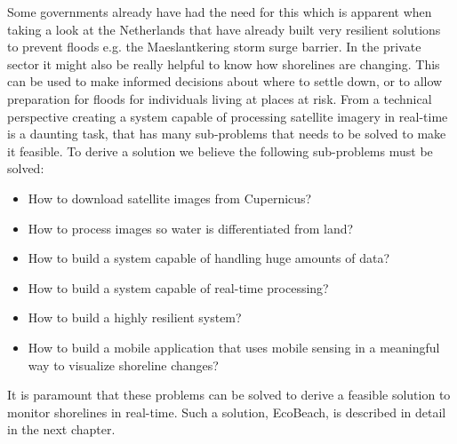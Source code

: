 Some governments already have had the need for this which is apparent when taking a look at the Netherlands that have already built very resilient solutions to prevent floods e.g. the Maeslantkering storm surge barrier.   \medbreak 
\noindent
In the private sector it might also be really helpful to know how shorelines are changing. This can be used to make informed decisions about where to settle down, or to allow preparation for floods for individuals living at places at risk.  \medbreak 
\noindent
From a technical perspective creating a system capable of processing satellite imagery in real-time is a daunting task, that has many sub-problems that needs to be solved to make it feasible.
To derive a solution we believe the following sub-problems must be solved:

\begin{itemize}
    \item How to download satellite images from Cupernicus?
    \item How to process images so water is differentiated from land?
    \item How to build a system capable of handling huge amounts of data? 
    \item How to build a system capable of real-time processing?
    \item How to build a highly resilient system?
    \item How to build a mobile application that uses mobile sensing in a meaningful way to visualize shoreline changes?
\end{itemize}
\noindent
It is paramount that these problems can be solved to derive a feasible solution to monitor shorelines in real-time. Such a solution, EcoBeach, is described in detail in the next chapter.
